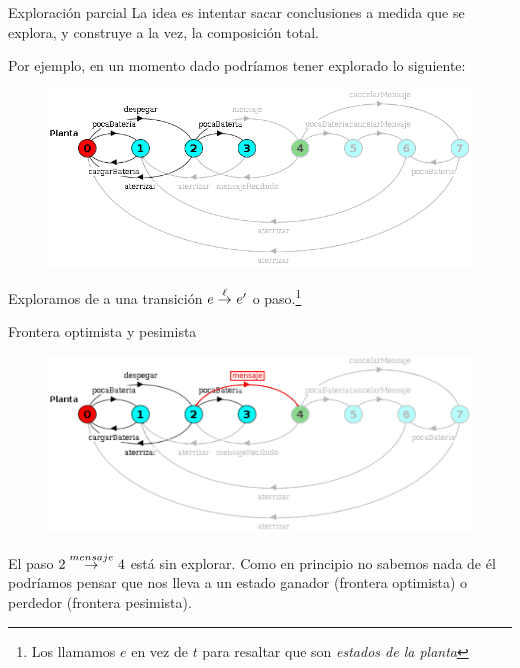 

\begin{frame}{Exploración parcial}
    La idea es intentar sacar conclusiones a medida que se explora, y construye a la vez, la composición total.
    
    Por ejemplo, en un momento dado podríamos tener explorado lo siguiente:
    \vspace{-10pt}
    \begin{figure}
     \includegraphics[width=\textwidth]{figures/partial.png}
    \end{figure}
    
    \vspace{-10pt}
    Exploramos de a una transición $e \overset{\ell}{\rightarrow}_{} e'$ o paso.\vspace{10pt}\footnote{Los llamamos $e$ en vez de $t$ para resaltar que son \textit{estados de la planta}}
\end{frame}
\begin{frame}{Frontera optimista y pesimista}
    \begin{figure}
     \includegraphics[width=\textwidth]{figures/frontera.png}
    \end{figure}
    El paso $2 \overset{mensaje}{\rightarrow}_{} 4$ está sin explorar. Como en principio no sabemos nada de él podríamos pensar que nos lleva a un estado ganador (frontera optimista) o perdedor (frontera pesimista).
\end{frame}

